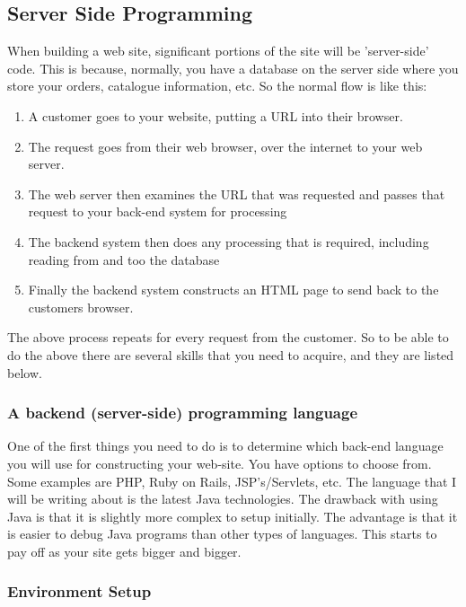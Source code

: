 \subsection{Server Side Programming}

When building a web site, significant portions of the site will be 'server-side' code.  This is because, normally, you have a database on the server side where you store your orders, catalogue information, etc.  So the normal flow is like this:

\begin{enumerate}
\item A customer goes to your website, putting a URL into their browser.
\item The request goes from their web browser, over the internet to your web server.
\item The web server then examines the URL that was requested and passes that request to your back-end system for processing
\item The backend system then does any processing that is required, including reading from and too the database
\item Finally the backend system constructs an HTML page to send back to the customers browser.
\end{enumerate}

The above process repeats for every request from the customer.  So to be able to do the above there are several skills that you need to acquire, and they are listed below.

\subsubsection{A backend (server-side) programming language}

One of the first things you need to do is to determine which back-end language you will use for constructing your web-site.  You have options to choose from.  Some examples are PHP, Ruby on Rails, JSP's/Servlets, etc.  The language that I will be writing about is the latest Java technologies.  The drawback with using Java is that it is slightly more complex to setup initially.  The advantage is that it is easier to debug Java programs than other types of languages.  This starts to pay off as your site gets bigger and bigger.

\subsubsection{Environment Setup}

